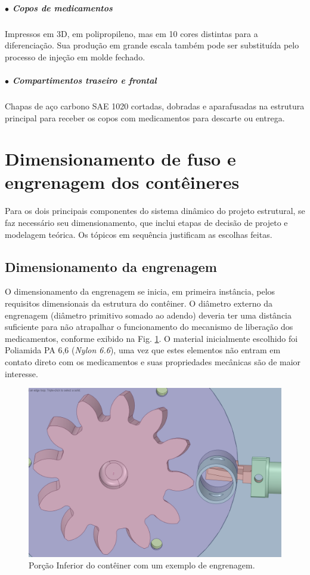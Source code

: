 \subparagraph*{$\bullet$ Copos de medicamentos} \hfill \label{sec:copo_estrutura}

Impressos em 3D, em polipropileno, mas em 10 cores distintas para a diferenciação. Sua produção em grande escala também pode ser substituída pelo processo de injeção em molde fechado. 

\subparagraph*{$\bullet$ Compartimentos traseiro e frontal} \hfill 

Chapas de aço carbono SAE 1020 cortadas, dobradas e aparafusadas na estrutura principal para receber os copos com medicamentos para descarte ou entrega.

\section{Dimensionamento de fuso e engrenagem dos contêineres} \label{section:dimensionamento_F_E} 

Para os dois principais componentes do sistema dinâmico do projeto estrutural, se faz necessário seu dimensionamento, que inclui etapas de decisão de projeto e modelagem teórica. Os tópicos em sequência justificam as escolhas feitas.

\subsection{Dimensionamento da engrenagem}

O dimensionamento da engrenagem se inicia, em primeira instância, pelos requisitos dimensionais da estrutura do contêiner. O diâmetro externo da engrenagem (diâmetro primitivo somado ao adendo) deveria ter uma distância suficiente para não atrapalhar o funcionamento do mecanismo de liberação dos medicamentos, conforme exibido na Fig. \ref{fig:mangueira_engrenagem}. O material inicialmente escolhido foi Poliamida PA 6,6 (\textit{Nylon 6.6}), uma vez que estes elementos não entram em contato direto com os medicamentos e suas propriedades mecânicas são de maior interesse.

\begin{figure}[H]
        \centering
        \includegraphics[width=.6\textwidth]{figuras/estrutura/Design/engrenagem_mangueira.png}
        \caption{Porção Inferior do contêiner com um exemplo de engrenagem.}
        \label{fig:mangueira_engrenagem}
    \end{figure} 

